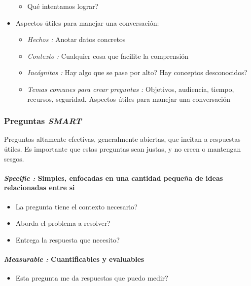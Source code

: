 \begin{itemize}
{\begin{itemize}
{\begin{itemize}
        \end{itemize}}
        \item{Qué intentamos lograr?}
    \end{itemize}}
    \item{Aspectos útiles para manejar una conversación:
    \begin{itemize}
        \item {\textit{Hechos : }Anotar datos concretos}
        \item {\textit{Contexto : }Cualquier cosa que facilite la comprensión}
        \item {\textit{Incógnitas : }Hay algo que se pase por alto? Hay conceptos desconocidos?}
        \item {\textit{Temas comunes para crear preguntas : }Objetivos, audiencia, tiempo, recursos, seguridad. Aspectos útiles para manejar una conversación}
    \end{itemize}}
\end{itemize}


\subsubsection{Preguntas \textit{SMART}}
Preguntas altamente efectivas, generalmente abiertas, que incitan a respuestas útiles. Es importante que estas preguntas sean justas, y no creen o mantengan sesgos.

\paragraph{\textit{Specific : }Simples, enfocadas en una cantidad pequeña de ideas relacionadas entre si}
\begin{itemize}
    \item {La pregunta tiene el contexto necesario?}
    \item {Aborda el problema a resolver?}
    \item {Entrega la respuesta que necesito?}
\end{itemize}

\paragraph{\textit{Measurable : }Cuantificables y evaluables}
\begin{itemize}
    \item {Esta pregunta me da respuestas que puedo medir?}
\end{itemize}


